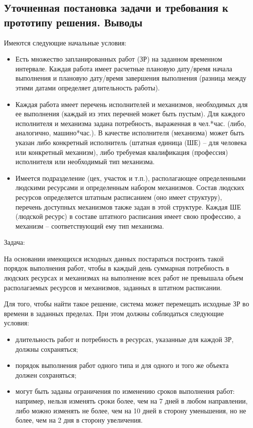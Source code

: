 \subsection{Уточненная постановка задачи и требования к прототипу решения. Выводы}
Имеются следующие начальные условия:
\begin{itemize}
	\item Есть множество запланированных работ (ЗР) на заданном временном интервале. Каждая работа имеет расчетные плановую дату/время начала выполнения и плановую дату/время завершения выполнения (разница между этими датами определяет длительность работы).
	\item Каждая работа имеет перечень исполнителей и механизмов, необходимых для ее выполнения (каждый из этих перечней может быть пустым). Для каждого исполнителя и механизма задана потребность, выраженная в чел.*час. (либо, аналогично, машино*час.).  В качестве исполнителя (механизма) может быть указан либо конкретный исполнитель (штатная единица (ШЕ) – для человека или конкретный механизм), либо требуемая квалификация (профессия) исполнителя или необходимый тип механизма.
	\item Имеется подразделение (цех, участок и т.п.), располагающее определенными людскими ресурсами и определенным набором механизмов. Состав людских ресурсов определяется штатным расписанием (оно имеет структуру), перечень доступных механизмов также задан в этой структуре. Каждая ШЕ (людской ресурс) в составе штатного расписания имеет свою профессию, а механизм – соответствующий ему тип механизма.
\end{itemize}
	Задача:
	
	На основании имеющихся исходных данных постараться построить такой порядок выполнения работ, чтобы в каждый день суммарная потребность в людских ресурсах и механизмах на выполнение всех работ не превышала объем располагаемых ресурсов и механизмов, заданных в штатном расписании.
	
	Для того, чтобы найти такое решение, система может перемещать исходные ЗР во времени в заданных пределах. При этом должны соблюдаться следующие условия:
	\begin{itemize}
		\item длительность работ и потребность в ресурсах, указанные для каждой ЗР, должны сохраняться;
		\item порядок выполнения работ одного типа и для одного и того же объекта должен сохраняться;
		\item могут быть заданы ограничения по изменению сроков выполнения работ: например, нельзя изменять сроки более, чем на 7 дней в любом направлении, либо можно изменять не более, чем на 10 дней в сторону уменьшения, но не более, чем на 2 дня в сторону увеличения.
	\end{itemize}

